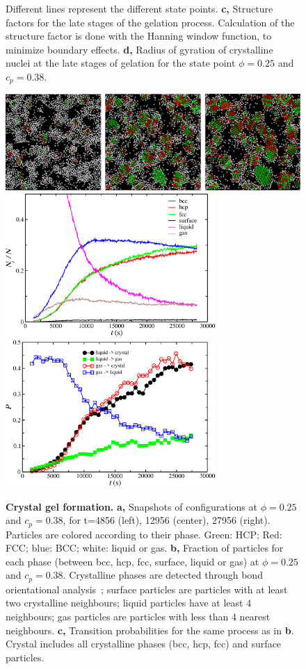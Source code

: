\documentclass[a4paper,preprint,superscriptaddress]{revtex4}
\begin{document}
\begin{figure}[!t]
{ Different lines represent the different state points. {\bf c,} Structure factors for the late stages of the gelation process. Calculation of the structure factor is done with the Hanning window function,  to minimize boundary effects. {\bf d,} Radius of gyration of crystalline nuclei at the late stages of gelation for the state point $\phi=0.25$ and $c_p=0.38$.} 
 \label{fig:crystals}
\end{figure}


\begin{figure}[!t]
 \centering
 \includegraphics[width=16cm]{oldfig/fig4a}
 \includegraphics[width=8cm]{oldfig/fig4b}
 \includegraphics[width=8cm]{oldfig/fig4c}
 \caption{
{\bf Crystal gel formation.} 
{\bf a,} Snapshots of configurations at $\phi=0.25$ and $c_p=0.38$, for t=4856 (left), 12956 (center), 27956 (right). Particles are colored according to their phase. Green: HCP; Red: FCC; blue: BCC; white: liquid or gas. 
 {\bf b,} Fraction of particles for each phase (between bcc, hcp, fcc, surface, liquid or gas) at $\phi=0.25$ and $c_p=0.38$.
 Crystalline phases are detected through bond orientational analysis~\cite{russo2012microscopic}; surface particles are particles
 with at least two crystalline neighbours; liquid particles have at least 4 neighbours; gas particles are particles with less than 4
 nearest neighbours.
{\bf c,} Transition probabilities for the same process as in {\bf b}. Crystal includes all crystalline phases (bcc, hcp, fcc) and surface particles.}
 \label{fig:transitions}
\end{figure}
\end{document}
